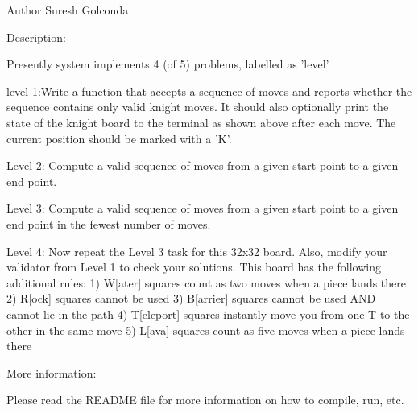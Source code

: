 \begin{DoxyAuthor}{\-Author}
\-Suresh \-Golconda 
\end{DoxyAuthor}
\begin{DoxyParagraph}{\-Description\-:}

\end{DoxyParagraph}

\begin{DoxyItemize}
\item \-Presently system implements 4 (of 5) problems, labelled as 'level'.
\end{DoxyItemize}


\begin{DoxyItemize}
\item level-\/1\-:\-Write a function that accepts a sequence of moves and reports whether the sequence contains only valid knight moves. \-It should also optionally print the state of the knight board to the terminal as shown above after each move. \-The current position should be marked with a '\-K'.
\end{DoxyItemize}


\begin{DoxyItemize}
\item \-Level 2\-: \-Compute a valid sequence of moves from a given start point to a given end point.
\end{DoxyItemize}


\begin{DoxyItemize}
\item \-Level 3\-: \-Compute a valid sequence of moves from a given start point to a given end point in the fewest number of moves.
\end{DoxyItemize}


\begin{DoxyItemize}
\item \-Level 4\-: \-Now repeat the \-Level 3 task for this 32x32 board. \-Also, modify your validator from \-Level 1 to check your solutions. \-This board has the following additional rules\-: 1) \-W\mbox{[}ater\mbox{]} squares count as two moves when a piece lands there 2) \-R\mbox{[}ock\mbox{]} squares cannot be used 3) \-B\mbox{[}arrier\mbox{]} squares cannot be used \-A\-N\-D cannot lie in the path 4) \-T\mbox{[}eleport\mbox{]} squares instantly move you from one \-T to the other in the same move 5) \-L\mbox{[}ava\mbox{]} squares count as five moves when a piece lands there
\end{DoxyItemize}

\begin{DoxyParagraph}{\-More information\-:}

\begin{DoxyItemize}
\item \-Please read the \-R\-E\-A\-D\-M\-E file for more information on how to compile, run, etc. 
\end{DoxyItemize}
\end{DoxyParagraph}
